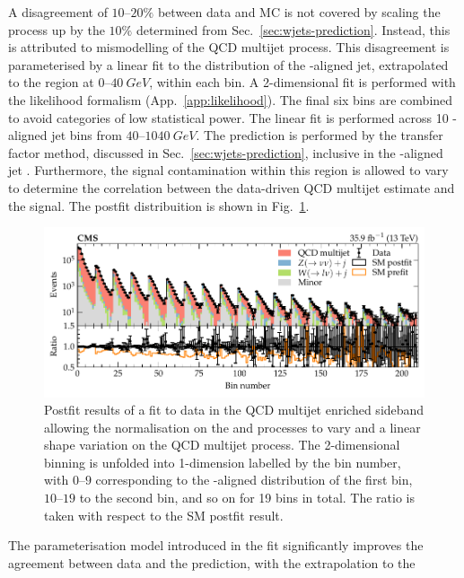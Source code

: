 A disagreement of $10$--$20\%$ between data and MC is not covered by scaling
the \IWlvj process up by the $10\%$ determined from
Sec.~\ref{sec:wjets-prediction}. Instead, this is attributed to mismodelling
of the QCD multijet process. This disagreement is parameterised by a linear
fit to the \pt distribution of the \ptmiss-aligned jet, extrapolated to the
\metplusjets region at {$0$--$\SI{40}{GeV}$}, within each \recoil bin. A
2-dimensional fit is performed with the likelihood formalism
(App.~\ref{app:likelihood}). The final six \recoil bins are combined to avoid
categories of low statistical power. The linear fit is performed across 10
\ptmiss-aligned jet \pt bins from {$40$--$\SI{1040}{GeV}$}. The \IWj
prediction is performed by the transfer factor method, discussed in
Sec.~\ref{sec:wjets-prediction}, inclusive in the \ptmiss-aligned jet \pt.
Furthermore, the \IZvvj signal contamination within this region is allowed to
vary to determine the correlation between the data-driven QCD multijet
estimate and the \IZvvj signal. The postfit distribuition
is shown in Fig.~\ref{fig:qcd_postfit}.
%
\begin{figure}
    \centering
    \includegraphics{chapters/042_backgrounds/images/qcd_postfit.pdf}
    \caption[QCD multijet estimation within the enriched sideband]{
        Postfit results of a fit to data in the QCD multijet enriched sideband allowing the normalisation on the \IZvvj and \IWlvj processes to vary and a linear shape variation on the QCD multijet process. The 2-dimensional binning is unfolded into 1-dimension labelled by the bin number, with $0$--$9$ corresponding to the \ptmiss-aligned distribution of the first \recoil bin, $10$--$19$ to the second \recoil bin, and so on for 19 \recoil bins in total. The ratio is taken with respect to the SM postfit result.
    }
    \label{fig:qcd_postfit}
\end{figure}
%
The parameterisation model introduced in the fit significantly improves the
agreement between data and the prediction, with the extrapolation to the
